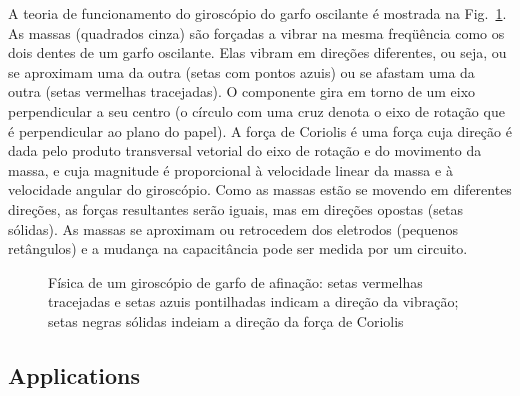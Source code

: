 A teoria de funcionamento do giroscópio do garfo oscilante é mostrada na Fig.~\ref{fig.tuning-gyro}. As massas (quadrados cinza) são forçadas a vibrar na mesma freqüência como os dois dentes de um garfo oscilante. Elas vibram em direções diferentes, ou seja, ou se aproximam uma da outra (setas com pontos azuis) ou se afastam uma da outra (setas vermelhas tracejadas). O componente gira em torno de um eixo perpendicular a seu centro (o círculo com uma cruz denota o eixo de rotação que é perpendicular ao plano do papel). A força de Coriolis é uma força cuja direção é dada pelo produto transversal vetorial do eixo de rotação e do movimento da massa, e cuja magnitude é proporcional à velocidade linear da massa e à velocidade angular do giroscópio. Como as massas estão se movendo em diferentes direções, as forças resultantes serão iguais, mas em direções opostas (setas sólidas). As massas se aproximam ou retrocedem dos eletrodos (pequenos retângulos) e a mudança na capacitância pode ser medida por um circuito.

\begin{figure}
\begin{center}
\end{center}
\caption{Física de um giroscópio de garfo de afinação: setas vermelhas tracejadas e setas azuis pontilhadas indicam a direção da vibração; setas negras sólidas indeiam a direção da força de Coriolis}\label{fig.tuning-gyro}
\end{figure}

\subsection{Applications}

